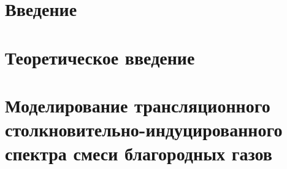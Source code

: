 \documentclass[12pt, a4paper, oneside]{extbook}
\begin{document}
\tableofcontents

\chapter{Введение}


\chapter{Теоретическое введение}


\chapter{Моделирование трансляционного столкновительно-индуцированного спектра смеси благородных газов} \label{chapter:two-atom}

\end{document}
